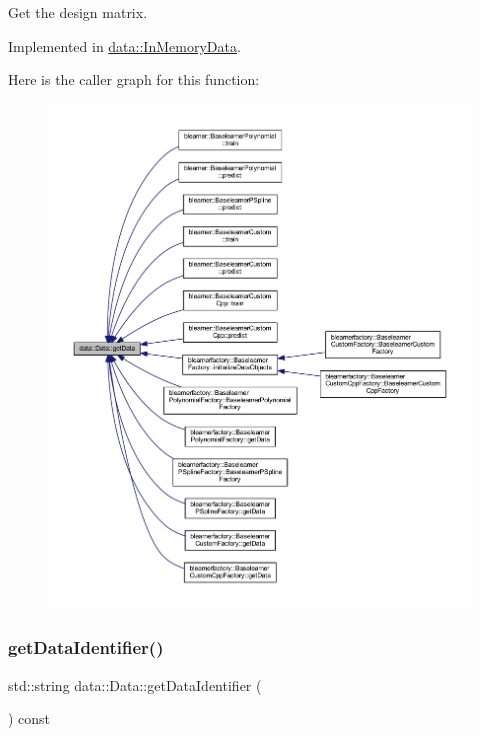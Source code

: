 Get the design matrix. 



Implemented in \mbox{\hyperlink{classdata_1_1_in_memory_data_ac0993c38a9633fa0f1ff787660b86c71}{data\+::\+In\+Memory\+Data}}.

Here is the caller graph for this function\+:
\nopagebreak
\begin{figure}[H]
\begin{center}
\leavevmode
\includegraphics[width=350pt]{classdata_1_1_data_aa4073af1bc8ccc7c50809e1676436eb4_icgraph}
\end{center}
\end{figure}
\mbox{\label{classdata_1_1_data_a1af63a4e5aa708de31e1ffdd727a4e16}} 
\subsubsection{\texorpdfstring{get\+Data\+Identifier()}{getDataIdentifier()}}
{\footnotesize\ttfamily std\+::string data\+::\+Data\+::get\+Data\+Identifier (\begin{DoxyParamCaption}{ }\end{DoxyParamCaption}) const}

